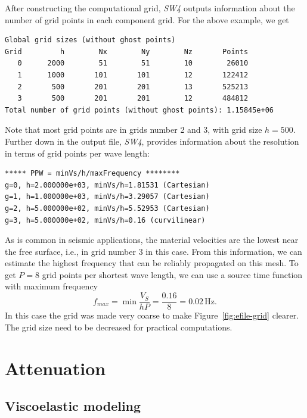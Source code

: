 \documentclass[11pt]{report}
\begin{document}
After constructing the computational grid, \emph{SW4} outputs information about the number of grid
points in each component grid. For the above example, we get
\begin{verbatim}
Global grid sizes (without ghost points)
Grid         h        Nx        Ny        Nz       Points
   0      2000        51        51        10        26010
   1      1000       101       101        12       122412
   2       500       201       201        13       525213
   3       500       201       201        12       484812
Total number of grid points (without ghost points): 1.15845e+06
\end{verbatim}
Note that most grid points are in grids number 2 and 3, with grid size $h=500$. Further down in
the output file, \emph{SW4}, provides information about the resolution in terms of grid points per
wave length:
\begin{verbatim}
***** PPW = minVs/h/maxFrequency ********
g=0, h=2.000000e+03, minVs/h=1.81531 (Cartesian)
g=1, h=1.000000e+03, minVs/h=3.29057 (Cartesian)
g=2, h=5.000000e+02, minVs/h=5.52953 (Cartesian)
g=3, h=5.000000e+02, minVs/h=0.16 (curvilinear)
\end{verbatim}
As is common in seismic applications, the material velocities are the lowest near the free surface,
i.e., in grid number 3 in this case. From this information, we can estimate the highest frequency
that can be reliably propagated on this mesh. To get $P=8$ grid points per shortest wave length, we
can use a source time function with maximum frequency
\[
f_{max} = \min\frac{V_S}{h P} = \frac{0.16}{8} = 0.02\, \mbox{Hz}.
\]
In this case the grid was made very coarse to make Figure~\ref{fig:efile-grid} clearer. The grid
size need to be decreased for practical computations.

\chapter{Attenuation}\label{sec:attenuation}
\section{Viscoelastic modeling}\label{sec:ve-model}
\end{document}
